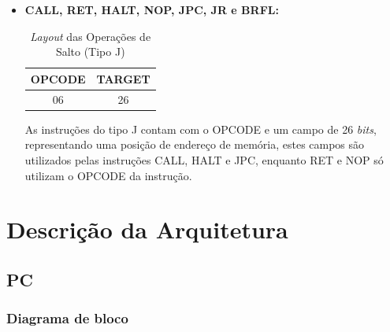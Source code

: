\documentclass{report}
\begin{document}
\begin{itemize}
  \item \textbf{CALL, RET, HALT, NOP, JPC, JR e BRFL:}

  \begin{table}[H]
\centering
	\begin{tabular}{|c|c|}
  	\hline 
  	\textbf{OPCODE} & \textbf{TARGET} \\ 
  	\hline 
  	06 & 26 \\ 
  	\hline 
  	\end{tabular} 
  	\caption{\textit{Layout} das Operações de Salto (Tipo J)}
  \end{table}
  
  As instruções do tipo J contam com o OPCODE e um campo de 26 \textit{bits}, representando uma posição de endereço de memória, estes campos são utilizados pelas instruções CALL, HALT e JPC, enquanto RET e NOP só utilizam o OPCODE da instrução.\\
  
  \end{itemize}

\chapter{Descrição da Arquitetura}

\section{PC}

\subsection{Diagrama de bloco}
\begin{figure}[H]
	\centering
	
\end{figure}      
\end{document}
